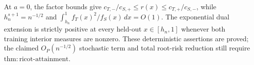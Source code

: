 At \(a=0\), the factor bounds give \(c_{T,-}/c_{S,+}\le r(x)\le c_{T,+}/c_{S,-}\), while \(h_n^{s+1}=n^{-1/2}\) and \(\int_{h_n}^1f_T(x)^2/f_S(x)\,dx=O(1)\). The exponential dual extension is strictly positive at every held-out \(x\in[h_n,1]\) whenever both training interior measures are nonzero. These deterministic assertions are proved; the claimed \(O_P(n^{-1/2})\) stochastic term and total root-risk reduction still require \(\mathrm{thm:ricot\text{-}attainment}\).